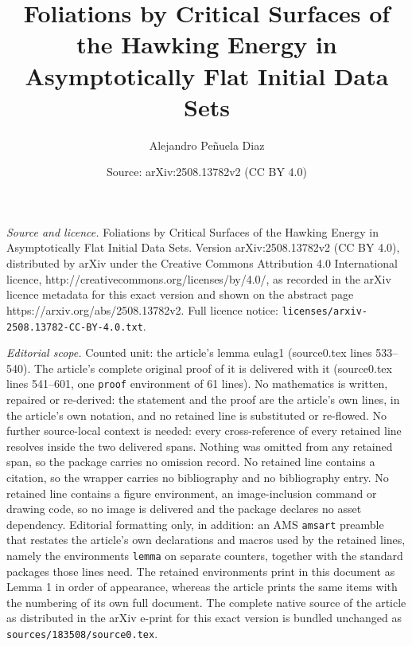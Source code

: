 \documentclass[10pt,a4paper]{amsart}
\title{Foliations by Critical Surfaces of the Hawking Energy in Asymptotically Flat Initial Data Sets}
\author{Alejandro Pe\~nuela Diaz}
\date{Source: arXiv:2508.13782v2 (CC BY 4.0)}
\begin{document}
\maketitle

\noindent\emph{Source and licence.} Foliations by Critical Surfaces of the Hawking Energy in Asymptotically Flat Initial Data Sets. Version arXiv:2508.13782v2 (CC BY 4.0), distributed by arXiv under the Creative Commons Attribution 4.0 International licence, http://creativecommons.org/licenses/by/4.0/, as recorded in the arXiv licence metadata for this exact version and shown on the abstract page https://arxiv.org/abs/2508.13782v2. Full licence notice: \texttt{licenses/arxiv-2508.13782-CC-BY-4.0.txt}.\par\smallskip

\noindent\textit{Editorial scope.} Counted unit: the article's lemma eulag1 (source0.tex lines 533--540). The article's complete original proof of it is delivered with it (source0.tex lines 541--601, one \texttt{proof} environment of 61 lines). No mathematics is written, repaired or re-derived: the statement and the proof are the article's own lines, in the article's own notation, and no retained line is substituted or re-flowed.  No further source-local context is needed: every cross-reference of every retained line resolves inside the two delivered spans.  Nothing was omitted from any retained span, so the package carries no omission record.  No retained line contains a citation, so the wrapper carries no bibliography and no bibliography entry.  No retained line contains a figure environment, an image-inclusion command or drawing code, so no image is delivered and the package declares no asset dependency.  Editorial formatting only, in addition: an AMS \texttt{amsart} preamble that restates the article's own declarations and macros used by the retained lines, namely the environments \texttt{lemma} on separate counters, together with the standard packages those lines need.  The retained environments print in this document as Lemma 1 in order of appearance, whereas the article prints the same items with the numbering of its own full document.  The complete native source of the article as distributed in the arXiv e-print for this exact version is bundled unchanged as \texttt{sources/183508/source0.tex}.
\end{document}
